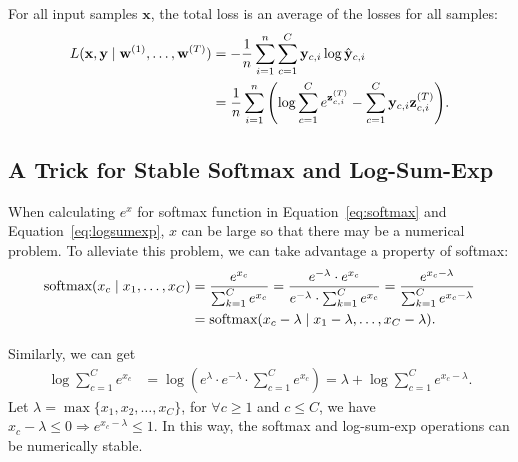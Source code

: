 \documentclass{article}
\begin{document}
For all input samples $\mathbf{x}$, the total loss is an average of the losses for all samples:
\begin{align}
    L(\mathbf{x}, \mathbf{y} \mid \mathbf{w}^{(1)}, \dots, \mathbf{w}^{(T)}) &= -\frac{1}{n}\sum_{i = 1}^{n}{\sum_{c = 1}^{C}{\mathbf{y}_{c, i}\log{\hat{\mathbf{y}}_{c, i}}}} \notag \\
    &= \frac{1}{n}\sum_{i = 1}^{n}{\left(\log{\sum_{c = 1}^{C}{e^{\mathbf{z}^{(T)}_{c, i}}}} - \sum_{c = 1}^{C}{\mathbf{y}_{c, i}\mathbf{z}^{(T)}_{c, i}}\right)}.
\end{align}

\subsection{A Trick for Stable Softmax and Log-Sum-Exp}
When calculating $e^x$ for softmax function in Equation~\eqref{eq:softmax} and Equation~\eqref{eq:logsumexp}, $x$ can be large so that there may be a numerical problem. To alleviate this problem, we can take advantage a property of softmax:
\begin{align}
    \text{softmax}(x_c \mid x_1, \dots, x_C) &= \frac{e^{x_c}}{\sum_{k = 1}^{C}{e^{x_c}}} = \frac{e^{-\lambda} \cdot e^{x_c}}{e^{-\lambda} \cdot \sum_{k = 1}^{C}{e^{x_c}}} = \frac{e^{x_c - \lambda}}{\sum_{k = 1}^{C}{e^{x_c - \lambda}}} \notag \\
    &= \text{softmax}(x_c - \lambda \mid x_1 - \lambda, \dots, x_C - \lambda).
\end{align}

Similarly, we can get
\begin{align}
    \log{\sum_{c = 1}^{C}{e^{x_c}}} &= \log{\left(e^{\lambda} \cdot e^{-\lambda} \cdot \sum_{c = 1}^{C}{e^{x_c}}\right)} = \lambda + \log{\sum_{c = 1}^{C}{e^{x_c - \lambda}}}.
\end{align}
Let $\lambda = \max{\{x_1, x_2, \dots, x_C\}}$, for $\forall c \ge 1$ and $c \le C$, we have $x_c - \lambda \le 0 \Rightarrow e^{x_c - \lambda} \le 1$. In this way, the softmax and log-sum-exp operations can be numerically stable.
\end{document}
